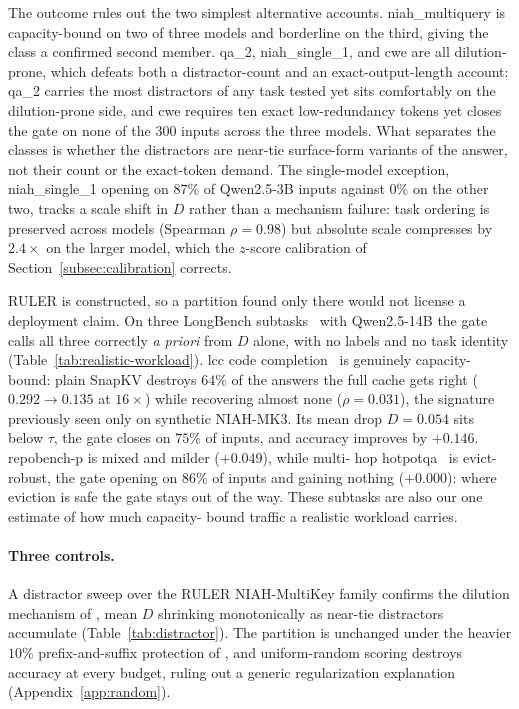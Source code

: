 \documentclass{article}
\begin{document}
The outcome rules out the two simplest alternative accounts. niah\_multiquery
is capacity-bound on two of three models and borderline on the third, giving
the class a confirmed second member. qa\_2, niah\_single\_1, and cwe are all
dilution-prone, which defeats both a distractor-count and an
exact-output-length account: qa\_2 carries the most distractors of any task
tested yet sits comfortably on the dilution-prone side, and cwe requires ten
exact low-redundancy tokens yet closes the gate on none of the $300$ inputs
across the three models. What separates the classes is whether the distractors
are near-tie surface-form variants of the answer, not their count or the
exact-token demand. The single-model exception, niah\_single\_1 opening on
$87\%$ of Qwen2.5-3B inputs against $0\%$ on the other two, tracks a scale
shift in $D$ rather than a mechanism failure: task ordering is preserved
across models (Spearman $\rho = 0.98$) but absolute scale compresses by
$2.4\times$ on the larger model, which the $z$-score calibration of
Section~\ref{subsec:calibration} corrects.

RULER is constructed, so a partition found only there would not license a
deployment claim. On three LongBench subtasks~\citep{arxiv230814508} with
Qwen2.5-14B the gate calls all three correctly \emph{a priori} from $D$ alone,
with no labels and no task identity (Table~\ref{tab:realistic-workload}). lcc
code completion~\citep{liu2024repobench} is genuinely capacity-bound: plain
SnapKV destroys $64\%$ of the answers the full cache gets right ($0.292 \to
0.135$ at $16\times$) while recovering almost none ($\rho = 0.031$), the
signature previously seen only on synthetic NIAH-MK3. Its mean drop $D =
0.054$ sits below $\tau$, the gate closes on $75\%$ of inputs, and accuracy
improves by $+0.146$. repobench-p is mixed and milder ($+0.049$), while multi-
hop hotpotqa~\citep{hotpotqa} is evict-robust, the gate opening on $86\%$ of
inputs and gaining nothing ($+0.000$): where eviction is safe the gate stays
out of the way. These subtasks are also our one estimate of how much capacity-
bound traffic a realistic workload carries.

\paragraph{Three controls.} A distractor sweep over the RULER NIAH-MultiKey family confirms the dilution
mechanism of \citet{arxiv260509649}, mean $D$ shrinking monotonically as near-tie distractors accumulate (Table~\ref{tab:distractor}). The partition is
unchanged under the heavier $10\%$ prefix-and-suffix protection of
\citet{arxiv260518053}, and uniform-random scoring destroys accuracy at every
budget, ruling out a generic regularization explanation
(Appendix~\ref{app:random}).
\end{document}
